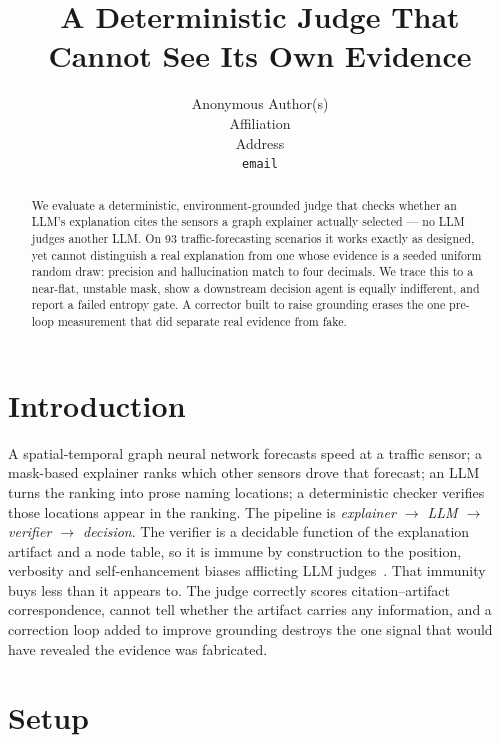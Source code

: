 \documentclass{article}
\title{A Deterministic Judge That Cannot See Its Own Evidence}
\author{%
  Anonymous Author(s)\\
  Affiliation\\
  Address\\
  \texttt{email}
}
\begin{document}
\maketitle

\begin{abstract}
We evaluate a deterministic, environment-grounded judge that checks whether an
LLM's explanation cites the sensors a graph explainer actually selected --- no LLM
judges another LLM. On 93 traffic-forecasting scenarios it works exactly as designed,
yet cannot distinguish a real explanation from one whose evidence is a seeded uniform
random draw: precision and hallucination match to four decimals. We trace this to a
near-flat, unstable mask, show a downstream decision agent is equally indifferent,
and report a failed entropy gate. A corrector built to raise grounding erases the one
pre-loop measurement that did separate real evidence from fake.
\end{abstract}

\section{Introduction}

A spatial-temporal graph neural network forecasts speed at a traffic sensor; a
mask-based explainer ranks which other sensors drove that forecast; an LLM turns
the ranking into prose naming locations; a deterministic checker verifies those
locations appear in the ranking. The pipeline is \emph{explainer $\rightarrow$ LLM
$\rightarrow$ verifier $\rightarrow$ decision}. The verifier is a decidable
function of the explanation artifact and a node table, so it is immune by
construction to the position, verbosity and self-enhancement biases afflicting LLM
judges~\citep{zheng2023judging}. That immunity buys less than it appears to. The
judge correctly scores citation--artifact correspondence, cannot tell whether the
artifact carries any information, and a correction loop added to improve grounding
destroys the one signal that would have revealed the evidence was fabricated.

\section{Setup}
\end{document}
